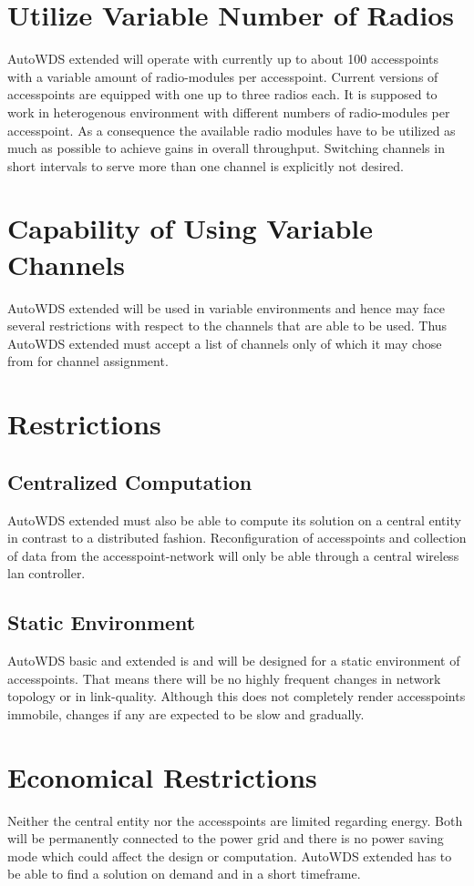   \section{Utilize Variable Number of Radios}
  AutoWDS extended will operate with currently up to about 100 accesspoints with a variable amount of radio-modules per accesspoint.
  Current versions of accesspoints are equipped with one up to three radios each. It is supposed to work in heterogenous environment with 
  different numbers of radio-modules per accesspoint. As a consequence the available radio modules 
  have to be utilized as much as possible to achieve gains in overall throughput.
  Switching channels in short intervals to serve more than one channel is explicitly not desired.
  \section{Capability of Using Variable Channels}
  AutoWDS extended will be used in variable environments and hence may face several restrictions with respect to the channels that are able to be used.
  Thus AutoWDS extended must accept a list of channels only of which it may chose from for channel assignment.
  \section{Restrictions}
  \subsection{Centralized Computation}
    AutoWDS extended must also be able to compute its solution on a central entity in contrast to a distributed fashion.
    Reconfiguration of accesspoints and collection of data from the accesspoint-network will only be able through a central wireless lan controller.
  \subsection{Static Environment}
    AutoWDS basic and extended is and will be designed for a static environment of accesspoints. That means there will be no highly frequent changes in
    network topology or in link-quality. Although this does not completely render accesspoints immobile, changes if any are expected to be slow and gradually.
\section{Economical Restrictions}
  Neither the central entity nor the accesspoints are limited regarding energy. Both will be permanently connected to the power grid and there is no power saving mode
  which could affect the design or computation.
  AutoWDS extended has to be able to find a solution on demand and in a short timeframe.